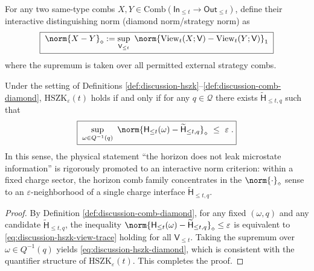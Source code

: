 \begin{definition}\label{def:discussion-comb-diamond}
For any two same-type combs \(X,Y\in \mathrm{Comb}(\mathsf{In}_{\le t}\to\mathsf{Out}_{\le t})\), define their interactive distinguishing norm (diamond norm/strategy norm) as
\begin{equation}\label{eq:discussion-comb-diamond-def}
\boxed{\;
\norm{X-Y}_\diamond
:=\sup_{\mathsf{V}_{\le t}}\ \norm{\mathrm{View}_t(X;\mathsf{V})-\mathrm{View}_t(Y;\mathsf{V})}_1\;}
\end{equation}
where the supremum is taken over all permitted external strategy combs.
\end{definition}

\begin{theorem}\label{thm:discussion-hszk-iff-diamond}
Under the setting of Definitions \ref{def:discussion-hszk}--\ref{def:discussion-comb-diamond},
\(\mathrm{HSZK}_\varepsilon(t)\)
holds if and only if for any \(q\in\mathcal{Q}\) there exists \(\widetilde{\mathsf{H}}_{\le t,q}\) such that
\begin{equation}\label{eq:discussion-hszk-diamond}
\boxed{\;
\sup_{\omega\in Q^{-1}(q)}\ \norm{\mathsf{H}_{\le t}(\omega)-\widetilde{\mathsf{H}}_{\le t,q}}_\diamond\ \le\ \varepsilon\;.}
\end{equation}
In this sense, the physical statement ``the horizon does not leak microstate information'' is rigorously promoted to an interactive norm criterion: within a fixed charge sector, the horizon comb family concentrates in the \(\norm{\cdot}_\diamond\) sense to an \(\varepsilon\)-neighborhood of a single charge interface \(\widetilde{\mathsf{H}}_{\le t,q}\).
\end{theorem}

\begin{proof}
By Definition \ref{def:discussion-comb-diamond}, for any fixed \((\omega,q)\) and any candidate \(\widetilde{\mathsf{H}}_{\le t,q}\), the inequality
\(
\norm{\mathsf{H}_{\le t}(\omega)-\widetilde{\mathsf{H}}_{\le t,q}}_\diamond\le \varepsilon
\)
is equivalent to \eqref{eq:discussion-hszk-view-trace} holding for all \(\mathsf{V}_{\le t}\).
Taking the supremum over \(\omega\in Q^{-1}(q)\) yields \eqref{eq:discussion-hszk-diamond}, which is consistent with the quantifier structure of \(\mathrm{HSZK}_\varepsilon(t)\). This completes the proof.
\end{proof}

